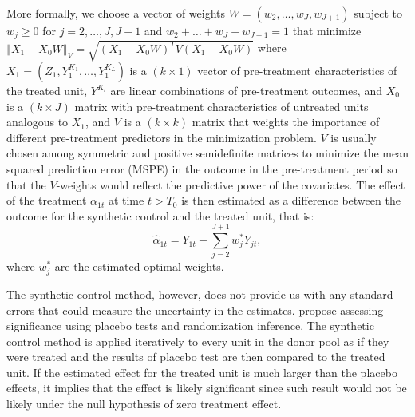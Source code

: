  
 More formally, we choose a vector of weights $W = (w_2, \dots, w_J, w_{J+1})$ subject to $w_j \geq 0$ for $j = 2, \dots, J, J + 1$ and $w_2 +  \dots + w_J + w_{J+1} = 1$ that minimize $\left\Vert X_1 - X_0 W \right\Vert_V = \sqrt{\left(X_1 - X_0 W\right)^T V \left(X_1 - X_0 W\right)}$ where
  $X_1 = (Z_1, Y_1^{K_1}, \dots, Y_1^{K_L})$ is a $(k \times 1)$ vector of pre-treatment characteristics of the treated unit,  $Y^{K_l}$ are linear combinations of
pre-treatment outcomes, and %
  $X_0$ is a $(k \times J)$ matrix with pre-treatment characteristics of untreated units analogous to $X_1$,  and
  $V$ is  a $(k \times k)$  matrix that weights the importance of different pre-treatment predictors in the minimization problem. 
  $V$ is usually chosen among symmetric and positive semidefinite matrices to minimize the  mean squared prediction error (MSPE) in the outcome in the pre-treatment period so that the $V$-weights would reflect the predictive power of the covariates. 
The effect of the treatment $\alpha_{1t}$ at time $t > T_0$ is then estimated as a difference between the outcome for the synthetic control and the treated unit, that is:
\begin{equation}
  \hat\alpha_{1t}  = Y_{1t} - \sum_{j = 2}^{J + 1} w_j^* Y_{jt},
\end{equation}
where $w^*_j$ are the estimated optimal weights. 

The synthetic control method, however, does not provide us with any standard errors that could measure the uncertainty in the estimates.
\citet{abadie_synthetic_2010} propose assessing significance  using  placebo tests and randomization inference. The synthetic control method is applied iteratively to every unit in the donor pool as if they were treated and the results of placebo test are then compared to the treated unit. If the estimated effect for the treated unit is much larger than the placebo effects, it implies that the effect is likely significant since 
such result would not be likely under the null hypothesis of zero treatment effect.

